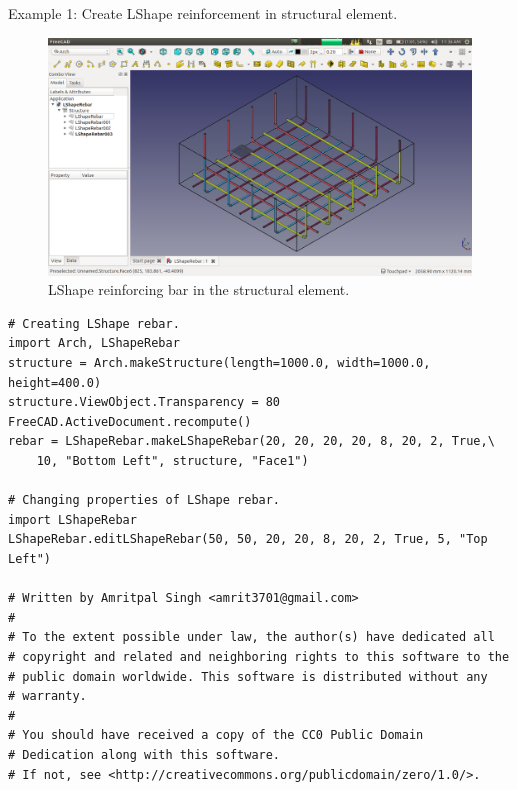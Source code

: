 Example 1: 
Create LShape reinforcement in structural element.
\begin{figure}[H] 
	\centering \includegraphics[scale=0.31]{images/LShapeRebarNew.png}
	\caption{LShape reinforcing bar in the structural element.}
\end{figure}

\begin{verbatim}
# Creating LShape rebar.
import Arch, LShapeRebar
structure = Arch.makeStructure(length=1000.0, width=1000.0, height=400.0)
structure.ViewObject.Transparency = 80
FreeCAD.ActiveDocument.recompute()
rebar = LShapeRebar.makeLShapeRebar(20, 20, 20, 20, 8, 20, 2, True,\
    10, "Bottom Left", structure, "Face1") 

# Changing properties of LShape rebar.
import LShapeRebar
LShapeRebar.editLShapeRebar(50, 50, 20, 20, 8, 20, 2, True, 5, "Top Left")

# Written by Amritpal Singh <amrit3701@gmail.com>
#
# To the extent possible under law, the author(s) have dedicated all
# copyright and related and neighboring rights to this software to the
# public domain worldwide. This software is distributed without any
# warranty.
#
# You should have received a copy of the CC0 Public Domain
# Dedication along with this software.
# If not, see <http://creativecommons.org/publicdomain/zero/1.0/>.
\end{verbatim}

